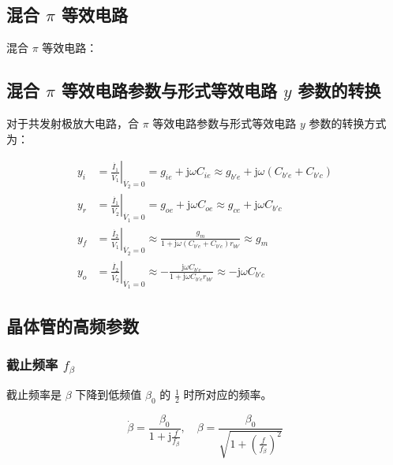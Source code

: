 \subsection{混合 $\pi$ 等效电路}

混合 $\pi$ 等效电路：



\subsection{混合 $\pi$ 等效电路参数与形式等效电路 $y$ 参数的转换}

对于共发射极放大电路，合 $\pi$ 等效电路参数与形式等效电路 $y$ 参数的转换方式为：

\begin{equation}
\begin{aligned}
    y_i &= \left. \frac{\dot{I_1}}{\dot{V_1}} \right|_{\dot{V_2} = 0} = g_{ie} + \text{j}\omega C_{ie} \approx g_{b'e} + \text{j}\omega (C_{b'e} + C_{b'c}) \\
    y_r &= \left. \frac{\dot{I_1}}{\dot{V_2}} \right|_{\dot{V_1} = 0} = g_{oe} + \text{j}\omega C_{oe} \approx g_{ce} + \text{j}\omega C_{b'c} \\
    y_f &= \left. \frac{\dot{I_2}}{\dot{V_1}} \right|_{\dot{V_2} = 0} \approx \frac{g_m}{1 + \text{j}\omega (C_{b'e} + C_{b'c})r_{bb'}} \approx g_m \\
    y_o &= \left. \frac{\dot{I_2}}{\dot{V_2}} \right|_{\dot{V_1} = 0} \approx - \frac{\text{j}\omega C_{b'c}}{1 + \text{j}\omega C_{b'e} r_{bb'}} \approx - \text{j}\omega C_{b'c}
\end{aligned}
\end{equation}

\subsection{晶体管的高频参数}

\subsubsection{截止频率 $f_{\beta}$}

截止频率是 $\beta$ 下降到低频值 $\beta_0$ 的 $\frac{1}{2}$ 时所对应的频率。

\begin{equation}
    \dot{\beta} = \frac{\beta_0}{ 1 + \text{j} \frac{f}{f_{\beta}} }, \quad \beta = \frac{\beta_0}{ \sqrt{1 + \left(\frac{f}{f_{\beta}}\right)^2 } }
\end{equation}

